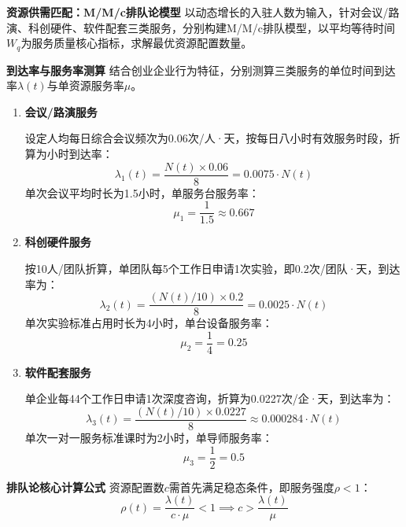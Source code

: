 \documentclass[12pt,a4paper]{article}
\begin{document}
\textbf{资源供需匹配：M/M/c排队论模型}
以动态增长的入驻人数为输入，针对会议/路演、科创硬件、软件配套三类服务，分别构建M/M/c排队模型，以平均等待时间$W_q$为服务质量核心指标，求解最优资源配置数量。

\textbf{到达率与服务率测算}
结合创业企业行为特征，分别测算三类服务的单位时间到达率$\lambda(t)$与单资源服务率$\mu$。

\begin{enumerate}
    \item \textbf{会议/路演服务}
    
    设定人均每日综合会议频次为0.06次/人·天，按每日八小时有效服务时段，折算为小时到达率：
    \begin{equation}
    \lambda_1(t) = \frac{N(t) \times 0.06}{8} = 0.0075 \cdot N(t)
    \end{equation}
    单次会议平均时长为1.5小时，单服务台服务率：
    \begin{equation}
    \mu_1 = \frac{1}{1.5} \approx 0.667
    \end{equation}

    \item \textbf{科创硬件服务}
    
    按10人/团队折算，单团队每5个工作日申请1次实验，即0.2次/团队·天，到达率为：
    \begin{equation}
    \lambda_2(t) = \frac{(N(t)/10) \times 0.2}{8} = 0.0025 \cdot N(t)
    \end{equation}
    单次实验标准占用时长为4小时，单台设备服务率：
    \begin{equation}
    \mu_2 = \frac{1}{4} = 0.25
    \end{equation}

    \item \textbf{软件配套服务}
    
    单企业每44个工作日申请1次深度咨询，折算为0.0227次/企·天，到达率为：
    \begin{equation}
    \lambda_3(t) = \frac{(N(t)/10) \times 0.0227}{8} \approx 0.000284 \cdot N(t)
    \end{equation}
    单次一对一服务标准课时为2小时，单导师服务率：
    \begin{equation}
    \mu_3 = \frac{1}{2} = 0.5
    \end{equation}
\end{enumerate}

\textbf{排队论核心计算公式}
资源配置数$c$需首先满足稳态条件，即服务强度$\rho<1$：
\begin{equation}
\rho(t) = \frac{\lambda(t)}{c \cdot \mu} < 1 \implies c > \frac{\lambda(t)}{\mu}
\end{equation}
\end{document}
